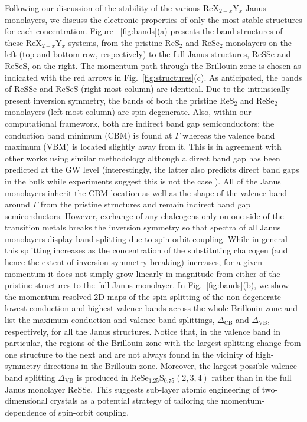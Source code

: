 \documentclass[reprint, superscriptaddress, amsmath,amssymb,prb,twocolumn]{revtex4-2}
\begin{document}
Following our discussion of the stability of the various ReX$_{2-x}$Y$_{x}$ Janus monolayers, we discuss the electronic properties of only the most stable structures for each concentration. Figure~ \ref{fig:bands}(a) presents the band structures of these ReX$_{2-x}$Y$_{x}$ systems, from the pristine ReS$_{2}$ and ReSe$_{2}$ monolayers on the left (top and bottom row, respectively) to the full Janus structures, ReSSe and ReSeS, on the right. The momentum path through the Brillouin zone is chosen as indicated with the red arrows in Fig.~\ref{fig:structures}(c). As anticipated, the bands of ReSSe and ReSeS (right-most column) are identical. Due to the intrinsically present inversion symmetry, the bands of both the pristine ReS$_{2}$ and ReSe$_{2}$ monolayers (left-most column) are spin-degenerate. Also, within our computational framework, both are indirect band gap semiconductors: the conduction band minimum (CBM) is found at $\Gamma$ whereas the valence band maximum (VBM) is located slightly away from it. This is in agreement with other works using similar methodology \cite{hart_prb_2021, zhong_prb_2015} although a direct band gap has been predicted at the GW level \cite{echeverry_prb_2018} (interestingly, the latter also predicts direct band gaps in the bulk while experiments suggest this is not the case \cite{webb_prb_2017, hart_scirep_2017, eickholt_prb_2018, gunasekera_jem_2018}). All of the Janus monolayers inherit the CBM location as well as the shape of the valence band around $\Gamma$ from the pristine structures and remain indirect band gap semiconductors. However, exchange of any chalcogens only on one side of the transition metals breaks the inversion symmetry so that spectra of all Janus monolayers display band splitting due to spin-orbit coupling. While in general this splitting  increases as the concentration of the substituting chalcogen (and hence the extent of inversion symmetry breaking) increases, for a given momentum it does not simply grow linearly in magnitude from either of the pristine structures to the full Janus monolayer. In Fig.~\ref{fig:bands}(b), we show the momentum-resolved 2D maps of the spin-splitting of the non-degenerate lowest conduction and highest valence bands across the whole Brillouin zone and list the maximum conduction and valence band splittings, $\Delta_{\mathrm{CB}}$ and $\Delta_{\mathrm{VB}}$, respectively, for all the Janus structures. Notice that, in the valence band in particular, the regions of the Brillouin zone with the largest splitting change from one structure to the next and are not always found in the vicinity of high-symmetry directions in the Brillouin zone. Moreover, the largest possible valence band splitting $\Delta_{\mathrm{VB}}$ is produced in ReSe$_{1.25}$S$_{0.75}(2,3,4)$ rather than in the full Janus monolayer ReSSe. This suggests sub-layer atomic engineering of two-dimensional crystals as a potential strategy of tailoring the momentum-dependence of spin-orbit coupling.
\end{document}
